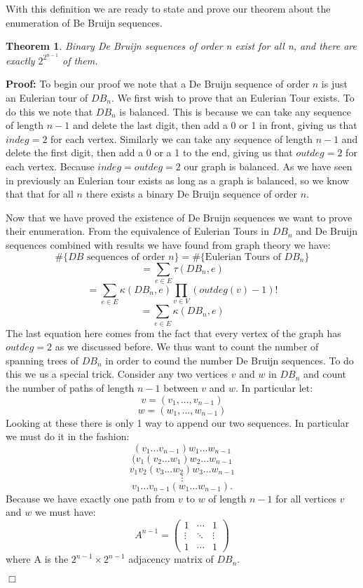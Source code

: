 \documentclass[11pt]{article}
\newtheorem{theorem}{Theorem}
\newenvironment{proof}{\noindent \textbf{Proof:}}{$\Box$}
\begin{document}
With this definition we are ready to state and prove our theorem about the enumeration of Be Bruijn sequences.

\begin{theorem}
Binary De Bruijn sequences of order n exist for all n, and there are exactly $2^{2^{n-1}}$ of them.
\end{theorem}


\begin{proof}
To begin our proof we note that a De Bruijn sequence of order $n$ is just an Eulerian tour of $DB_n$. We first wish to prove that an Eulerian Tour exists. To do this we note that $DB_n$ is balanced. This is because we can take any sequence of length $n-1$ and delete the last digit, then add a 0 or 1 in front, giving us that $indeg=2$ for each vertex. Similarly we can take any sequence of length $n-1$ and delete the first digit, then add a 0 or a 1 to the end, giving us that $outdeg=2$ for each vertex. Because $indeg=outdeg=2$ our graph is balanced. As we have seen in previously an Eulerian tour exists as long as a graph is balanced, so we know that that for all $n$ there exists a binary De Bruijn sequence of order $n$.

Now that we have proved the existence of De Bruijn sequences we want to prove their enumeration. From the equivalence of Eulerian Tours in $DB_n$ and De Bruijn sequences combined with results we have found from graph theory we have:
	\[ \# \{DB \mbox{ sequences of order } n \} = \# \{ \mbox{Eulerian Tours of } DB_n \} \]
	\[= \sum_{e\in E} \tau (DB_n,e) \]
	\[= \sum_{e\in E} \kappa (DB_n,e) \prod_{v \in V} (outdeg(v) -1)!\]
	\[= \sum_{e\in E} \kappa (DB_n,e) \]
The last equation here comes from the fact that every vertex of the graph has $outdeg=2$ as we discussed before. We thus want to count the number of spanning trees of $DB_n$ in order to cound the number De Bruijn sequences. To do this we us a special trick. Consider any two vertices $v$ and $w$ in $DB_n$ and count the number of paths of length $n-1$ between $v$ and $w$. In particular let:
	\[v = (v_1,...,v_{n-1}) \]
	\[w = (w_1,...,w_{n-1}) \]
Looking at these there is only 1 way to append our two sequences. In particular we must do it in the fashion:
	\[(v_1...v_{n-1})w_1...w_{n-1} \]
	\[(v_1 (v_2...w_1)w_2...w_{n-1}  \]
	\[v_1 v_2 ( v_3...w_2) w_3...w_{n-1}  \]
	\[\vdots\]
	\[v_1...v_{n-1}(w_1...w_{n-1})  .\]
Because we have exactly one path from $v$ to $w$ of length $n-1$ for all vertices $v$ and $w$ we must have:
	\[ A^{n-1} =
 \begin{pmatrix}
  1 &  \cdots & 1 \\
  \vdots  & \ddots & \vdots  \\
  1 & \cdots & 1
 \end{pmatrix} \]
where A is the $2^{n-1} \times 2^{n-1}$ adjacency matrix of $DB_n$.


\end{proof}
\end{document}

